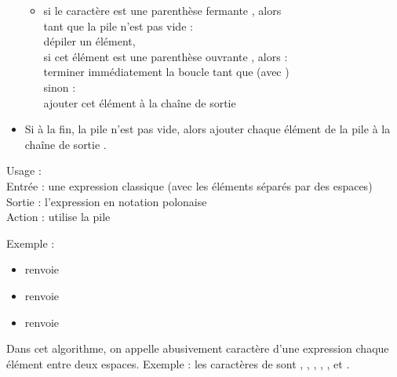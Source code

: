 \documentclass[11pt,class=report,crop=false]{standalone}
\begin{document}
\begin{activite}
\begin{algorithme}
\begin{itemize}
\begin{itemize}
     \item si le caractère est une parenthèse fermante , alors \\
     tant que la pile n'est pas vide : \\
     \indentation dépiler un élément,\\
     \indentation si cet élément est une parenthèse ouvrante , alors :\\
     \indentation \indentation terminer immédiatement la boucle \og{}tant que\fg{} (avec )\\  
     \indentation sinon :\\          
     \indentation \indentation ajouter cet élément à la chaîne de sortie \\

   \end{itemize}          
         
    \item Si à la fin, la pile n'est pas vide, alors ajouter chaque élément de la pile à la chaîne de sortie .
  \end{itemize} 
             
 \end{algorithme}
 
 
 
   \begin{fonction}
  Usage :  \\
  Entrée : une expression classique (avec les éléments séparés par des espaces) \\
  Sortie : l'expression en notation polonaise\\
  Action : utilise la pile
  
  \medskip
  
  Exemple :
  \begin{itemize}
     \item {} renvoie 
     \item {} renvoie 
     \item {} renvoie 
  \end{itemize}     
  \end{fonction}
  
 Dans cet algorithme, on appelle abusivement \og{}caractère\fg{} d'une expression chaque élément entre deux espaces. Exemple : les caractères de  sont \ci{(}, , \ci{+}, , \ci{)}, \ci{*} et .
 

\end{activite}
\end{document}
